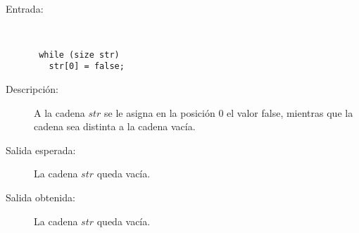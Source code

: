 \hfil \\
	\begin{description}
		\item [Entrada:] \hfill \\
\begin{lstlisting}
 while (size str) 
   str[0] = false;
\end{lstlisting}
		\item [Descripción:] A la cadena $str$ se le asigna en la posición 0 el valor false, mientras que la cadena sea distinta a la cadena vacía.
		\item [Salida esperada:] La cadena $str$ queda vacía.
		\item [Salida obtenida:] La cadena $str$ queda vacía.
	\end{description}

